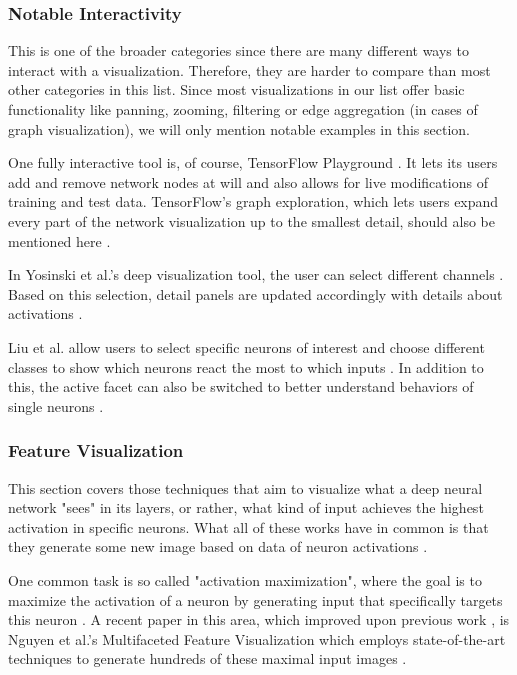 \documentclass{acmsiggraph}               %
\begin{document}
\subsubsection{Notable Interactivity}
This is one of the broader categories since there are many different ways to interact with a visualization. Therefore, they are harder to compare than most other categories in this list. Since most visualizations in our list offer basic functionality like panning, zooming, filtering or edge aggregation (in cases of graph visualization), we will only mention notable examples in this section.

One fully interactive tool is, of course, TensorFlow Playground \cite{Smilkov2017}. It lets its users add and remove network nodes at will and also allows for live modifications of training and test data. TensorFlow's graph exploration, which lets users expand every part of the network visualization up to the smallest detail, should also be mentioned here \cite{Wongsuphasawat2018}.

In Yosinski et al.'s deep visualization tool, the user can select different channels \cite{Yosinski2015}. Based on this selection, detail panels are updated accordingly with details about activations \cite{Yosinski2015}.

Liu et al. allow users to select specific neurons of interest and choose different classes to show which neurons react the most to which inputs \cite{Liu2016}. In addition to this, the active facet can also be switched to better understand behaviors of single neurons \cite{Liu2016}.
\subsubsection{Feature Visualization}
This section covers those techniques that aim to visualize what a deep neural network "sees" in its layers, or rather, what kind of input achieves the highest activation in specific neurons. What all of these works have in common is that they generate some new image based on data of neuron activations \cite{Hohman2018}.

One common task is so called "activation maximization", where the goal is to maximize the activation of a neuron by generating input that specifically targets this neuron \cite{Hohman2018}. A recent paper in this area, which improved upon previous work \cite{Erhan2009}, is Nguyen et al.'s Multifaceted Feature Visualization which employs state-of-the-art techniques to generate hundreds of these maximal input images \cite{Hohman2018,Nguyen2016}. 
\end{document}
